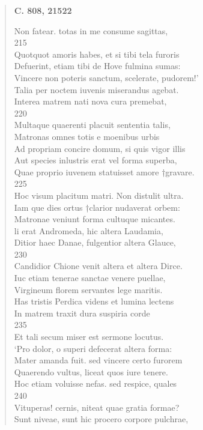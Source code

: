 \documentclass[11pt, a4paper]{report}
\begin{document}
\begin{verse}
    \begin{center} \textbf{C. 808, 21522} \end{center} \marginpar{[294]} Non fatear. totas in me consume sagittas, \\ 215 \\ Quotquot amoris habes, et si tibi tela furoris \\ Defuerint, etiam tibi de Hove fulmina sumas: \\ Vincere non poteris sanctum, scelerate, pudorem!’ \\ Talia per noctem iuvenis miserandus agebat. \\ Interea matrem nati nova cura premebat, \\ 220 \\ Multaque quaerenti placuit sententia talis, \\ Matronas omnes totis e moenibus urbis \\ Ad propriam concire domum, si quis vigor illis \\ Aut species inlustris erat vel forma superba, \\ Quae proprio iuvenem statuisset amore †gravare. \\ 225 \\ Hoc visum placitum matri. Non distulit ultra. \\ Iam \lbrack que \rbrack  dies ortus †clarior nudaverat orbem: \\ Matronae veniunt forma cultuque micantes. \\ li erat Andromeda, hic altera Laudamia, \\ Ditior haec Danae, fulgentior altera Glauce, \\ 230 \\ Candidior Chione venit  \lbrack altera et altera Dirce. \\ Iuc etiam tenerae sanctae venere puellae, \\ Virgineum florem servantes lege maritis. \\ Has tristis Perdica videns et lumina lectens \\ In matrem traxit dura suspiria corde \\ 235 \\ Et tali secum miser est sermone locutus. \\ ‘Pro dolor, o superi defecerat altera forma: \\ Mater amanda fuit. sed vincere certo furorem \\ Quaerendo vultus, liceat quos iure tenere. \\ Hoc etiam voluisse nefas. sed respice, quales \\ 240 \\ Vituperas! cernis, niteat quae gratia formae? \\ Sunt niveae, sunt hic procero corpore pulchrae, \\ 

\end{verse}
\end{document}
